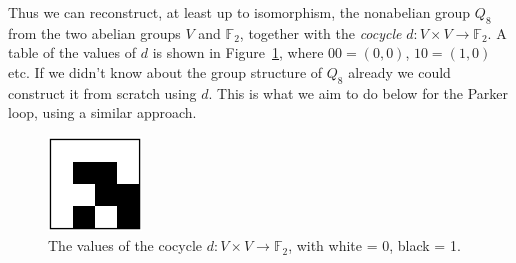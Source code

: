 \documentclass{article}
\theoremstyle{plain}
\theoremstyle{definition}
\def \FF {\mathbb{F}}
\begin{document}
Thus we can reconstruct, at least up to isomorphism, the nonabelian group $Q_8$ from the two abelian groups $V$ and $\FF_2$, together with the \emph{cocycle} $d\colon V\times V\to \FF_2$.
A table of the values of $d$ is shown in Figure~\ref{fig:cocycle for q8}, where $00=(0,0)$, $10 = (1,0)$ etc.
If we didn't know about the group structure of $Q_8$ already we could construct it from scratch using $d$.
This is what we aim to do below for the Parker loop, using a similar approach.

\begin{figure}[!b]
\begin{center}
\includegraphics[height=2.5cm]{quaternion_cocyc} %
\end{center}
\caption{The values of the cocycle $d\colon V\times V\to \FF_2$, with white = 0, black = 1.}
\label{fig:cocycle for q8}
\end{figure}

\end{document}
